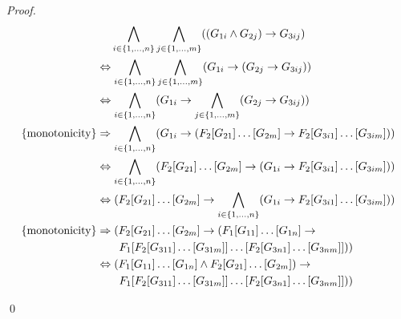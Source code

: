 \begin{techreport}
\begin{lemma}
\end{lemma}
\begin{proof}
  \begin{align*}
   &\hphantom{{}\Rightarrow}
    \bigwedge_{i\in \{1,\dots,n\}} \bigwedge_{j\in \{1,\dots,m\}} 
     ((G_{1i} \land G_{2j}) \rightarrow G_{3ij})\\
    &\Leftrightarrow
    \bigwedge_{i\in \{1,\dots,n\}} \bigwedge_{j\in \{1,\dots,m\}} 
     (G_{1i} \rightarrow (G_{2j} \rightarrow G_{3ij}))\\
    &\Leftrightarrow
    \bigwedge_{i\in \{1,\dots,n\}} (G_{1i} \rightarrow 
      \bigwedge_{j\in \{1,\dots,m\}} (G_{2j} \rightarrow G_{3ij}))\\
    \text{\{monotonicity\}} &\Rightarrow
    \bigwedge_{i\in \{1,\dots,n\}} (G_{1i} \rightarrow 
      (F_2[G_{21}]\dots [G_{2m}] \rightarrow F_2[G_{3i1}]\dots [G_{3im}]))\\
    &\Leftrightarrow
    \bigwedge_{i\in \{1,\dots,n\}} (F_2[G_{21}]\dots [G_{2m}] \rightarrow
     (G_{1i} \rightarrow 
      F_2[G_{3i1}]\dots [G_{3im}]))\\
    &\Leftrightarrow
    (F_2[G_{21}]\dots [G_{2m}] \rightarrow
    \bigwedge_{i\in \{1,\dots,n\}} (G_{1i} \rightarrow 
      F_2[G_{3i1}]\dots [G_{3im}]))\\
    \text{\{monotonicity\}}&\Rightarrow
    (F_2[G_{21}]\dots [G_{2m}] \rightarrow (F_1[G_{11}]\dots [G_{1n}]
    \rightarrow \\
     & \qquad
    F_1[F_2[G_{311}]\dots [G_{31m}]]\dots [F_2[G_{3n1}]\dots
      [G_{3nm}]]))\\
    &\Leftrightarrow
     (F_1[G_{11}]\dots [G_{1n}] \land F_2[G_{21}]\dots [G_{2m}]) \rightarrow \\
       &\qquad F_1[F_2[G_{311}]\dots [G_{31m}]]\dots [F_2[G_{3n1}]\dots [G_{3nm}]]))
  \end{align*}
  \vspace{-12pt}\strut\qed
\end{proof}

\end{techreport}
